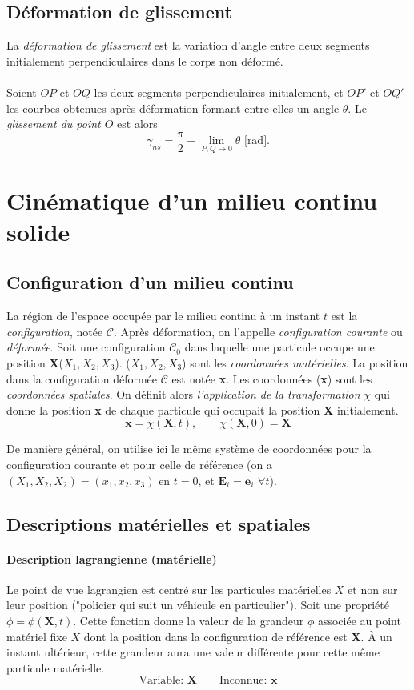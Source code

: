 \subsection{Déformation de glissement}
La \emph{déformation de glissement} est la variation d'angle entre deux segments initialement perpendiculaires dans le corps non déformé.
\paragraph{}
Soient $OP$ et $OQ$ les deux segments perpendiculaires initialement, et $OP'$ et $OQ'$ les courbes obtenues après déformation formant entre elles un angle $\theta$. Le \emph{glissement du point $O$} est alors
$$\gamma_{ns}=\frac{\pi}{2}-\lim_{P,Q\rightarrow 0}\theta \text{ [rad]}.$$

\section{Cinématique d'un milieu continu solide}
\subsection{Configuration d'un milieu continu}
La région de l'espace occupée par le milieu continu à un instant $t$ est la \emph{configuration}, notée $\mathcal{C}$. Après déformation, on l'appelle \emph{configuration courante} ou \emph{déformée}. Soit une configuration $\mathcal{C}_0$ dans laquelle une particule occupe une position \textbf{X}($X_1, X_2, X_3$). ($X_1, X_2, X_3$) sont les \emph{coordonnées matérielles}. La position dans la configuration déformée $\mathcal{C}$ est notée \textbf{x}. Les coordonnées (\textbf{x}) sont les \emph{coordonnées spatiales}. On définit alors \emph{l'application de la transformation} $\chi$ qui donne la position \textbf{x} de chaque particule qui occupait la position \textbf{X} initialement. 
$$\textbf{x}=\chi(\textbf{X},t),\qquad \chi(\textbf{X},0)=\textbf{X}$$

De manière général, on utilise ici le même système de coordonnées pour la configuration courante et pour celle de référence (on a $(X_1, X_2, X_2)=(x_1, x_2, x_3)$ en $t=0$, et $\textbf{E}_i=\textbf{e}_i$ $\forall t$).

\subsection{Descriptions matérielles et spatiales}
\paragraph{Description lagrangienne (matérielle)}
Le point de vue lagrangien est centré sur les particules matérielles $X$ et non sur leur position ("policier qui suit un véhicule en particulier"). Soit une propriété $\phi=\phi(\textbf{X},t)$. Cette fonction donne la valeur de la grandeur $\phi$ associée au point matériel fixe $X$ dont la position dans la configuration de référence est \textbf{X}. \`A un instant ultérieur, cette grandeur aura une valeur différente pour cette même particule matérielle.
 $$\text{Variable: } \textbf{X}\qquad \text{Inconnue: }\textbf{x}$$

